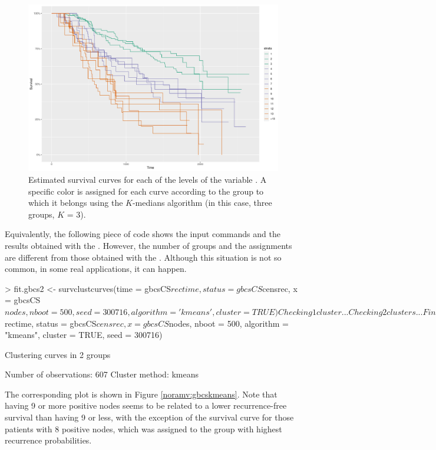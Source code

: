 \begin{figure}[htbp]
\includegraphics[width = 14cm]{breast_cancer_kmedians.pdf}
\caption{\label{noramv:gbcskmedians}
Estimated survival curves for each of the levels of the variable . A specific color is assigned for each curve according to the group to which it belongs using the $K$-medians algorithm (in this case, three groups, $K$ = 3).}
\end{figure}


Equivalently, the following piece of code shows the input commands and the results obtained with the . However, the number of groups and the assignments are  different from those  obtained with the . Although this situation is not so common, in some real applications, it can happen.  


\begin{example}
> fit.gbcs2 <- survclustcurves(time = gbcsCS$rectime, status = gbcsCS$censrec, 
		 x = gbcsCS$nodes, nboot = 500, seed = 300716, algorithm = 'kmeans',
	         cluster = TRUE)
Checking 1 cluster... 
Checking 2 clusters... 

Finally, there are 2 clusters.


> fit.gbcs2

Call:  
survclustcurves(time = gbcsCS$rectime, status = gbcsCS$censrec, 
    x = gbcsCS$nodes, nboot = 500, algorithm = "kmeans", cluster = TRUE, 
    seed = 300716)

Clustering curves in 2 groups

Number of observations:  607
Cluster method:  kmeans
\end{example}


The corresponding plot is shown in Figure \ref{noramv:gbcskmeans}. Note that having 9 or more positive nodes seems to be related to a lower recurrence-free survival than having 9 or less, with the exception of the survival curve for those patients with 8 positive nodes, which was assigned to the group with highest recurrence probabilities.



